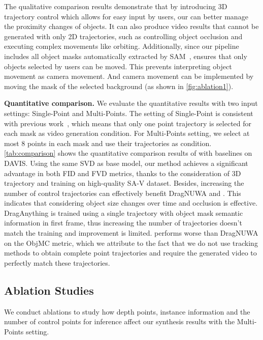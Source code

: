 The qualitative comparison results demonstrate that by introducing 3D trajectory control which allows for easy input by users, our \method can better manage the proximity changes of objects. It can also produce video results that cannot be generated with only 2D trajectories, such as controlling object occlusion and executing complex movements like orbiting. Additionally, since our pipeline includes all object masks automatically extracted by SAM~\cite{SAM}, \method ensures that only objects selected by users can be moved. This prevents interpreting object movement as camera movement. And camera movement can be implemented by moving the mask of the selected background (as shown in \cref{fig:ablation1}).



\noindent \textbf{Quantitative comparison.}
We evaluate the quantitative results with two input settings: Single-Point and Multi-Points. The setting of Single-Point is consistent with previous work~\cite{DragAnything}, which means that only one point trajectory is selected for each mask as video generation condition.
For Multi-Points setting, we select at most 8 points in each mask and use their trajectories as condition. \cref{tab:comparison} shows the quantitative comparison results of \method with baselines on DAVIS. Using the same SVD as base model, our method achieves a significant advantage in both FID and FVD metrics, thanks to the consideration of 3D trajectory and training on high-quality SA-V dataset. Besides, increasing the number of control trajectories can effectively benefit DragNUWA and \method. This indicates that considering object size changes over time and occlusion is effective. DragAnything is trained using a single trajectory with object mask semantic information in first frame, thus increasing the number of trajectories doesn't match the training and improvement is limited. \method performs worse than DragNUWA on the ObjMC metric, which we attribute to the fact that we do not use tracking methods to obtain complete point trajectories and require the generated video to perfectly match these trajectories.




\subsection{Ablation Studies}
We conduct ablations to study how depth points, instance information and the number of control points for inference affect our synthesis results with the Multi-Points setting.

